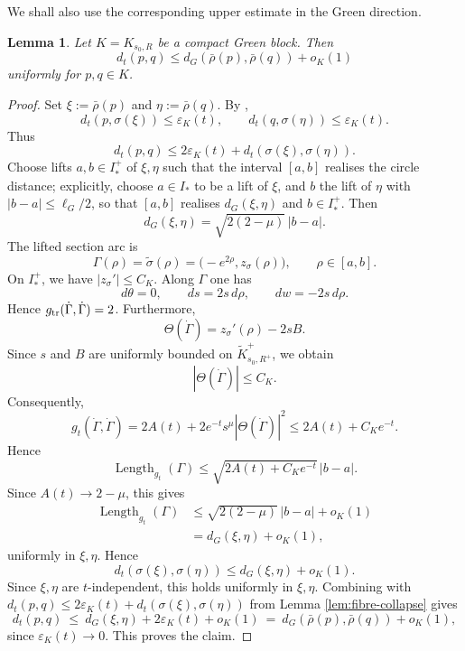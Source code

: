 \documentclass[12pt]{amsart}
\numberwithin{equation}{section}
\newtheorem{lema}{Lemma}
\theoremstyle{remark}
\theoremstyle{definition}
\begin{document}
We shall also use the corresponding upper estimate in the Green direction.

\begin{lema}
\label{lem:green-upper-estimate}
Let $K=K_{s_0,R}$ be a compact Green block. Then
\begin{equation*}
d_t(p,q)
\leq
d_G(\bar\rho(p),\bar\rho(q))+o_K(1)
\end{equation*}
uniformly for $p,q\in K$.
\end{lema}

\begin{proof}
Set $\xi:=\bar\rho(p)$ and $\eta:=\bar\rho(q)$.
By ,
$$
d_t(p,\sigma(\xi))\leq \varepsilon_K(t),
\qquad
d_t(q,\sigma(\eta))\leq \varepsilon_K(t).
$$
Thus
$$
d_t(p,q)
\leq
2\varepsilon_K(t)+d_t(\sigma(\xi),\sigma(\eta)).
$$
Choose lifts $a,b\in I_*^+$ of $\xi,\eta$ such that the interval
$[a,b]$ realises the circle distance; explicitly, choose $a\in I_*$ to be a lift of $\xi$, and
$b$ the lift of $\eta$ with $|b-a|\le\ell_G/2$, so that $[a,b]$ realises
$d_G(\xi,\eta)$ and $b\in I^+_*$.
Then
$$
d_G(\xi,\eta)
=
\sqrt{2(2-\mu)}\,|b-a|.
$$
The lifted section arc is
$$
\Gamma(\rho)=\widetilde\sigma(\rho)
=
\bigl(-e^{2\rho},z_\sigma(\rho)\bigr),
\qquad
\rho\in[a,b].
$$
On $I_*^+$, we have $|z_\sigma'|\leq C_K$. Along $\Gamma$ one has
$$
d\theta=0,
\qquad
ds=2s\,d\rho,
\qquad
dw=-2s\,d\rho.
$$
Hence $g_{\rm tr}(\dot\Gamma,\dot\Gamma)=2$. Furthermore,
$$
\Theta(\dot\Gamma)
=
z_\sigma'(\rho)-2sB.
$$
Since $s$ and $B$ are uniformly bounded on $\widetilde K^+_{s_0,R^+}$, we obtain
$$
|\Theta(\dot\Gamma)|\leq C_K.
$$
Consequently,
$$
g_t(\dot\Gamma,\dot\Gamma)=2A(t)+2e^{-t}s^\mu|\Theta(\dot\Gamma)|^2\leq 2A(t)+C_K e^{-t}.
$$
Hence
$$
\operatorname{Length}_{g_t}(\Gamma)
\leq
\sqrt{2A(t)+C_Ke^{-t}}\,|b-a|.
$$
Since $A(t)\to2-\mu$, this gives
\begin{align*}
\operatorname{Length}_{g_t}(\Gamma)
&\leq
\sqrt{2(2-\mu)}\,|b-a|+o_K(1)\\
&=
d_G(\xi,\eta)+o_K(1),
\end{align*}
uniformly in $\xi,\eta$. Hence
$$
d_t(\sigma(\xi),\sigma(\eta))
\leq
d_G(\xi,\eta)+o_K(1).
$$
Since $\xi,\eta$ are $t$-independent, this holds uniformly in $\xi,\eta$.
Combining with $d_t(p,q)\le2\varepsilon_K(t)+d_t(\sigma(\xi),\sigma(\eta))$
from Lemma \ref{lem:fibre-collapse} gives
\[
d_t(p,q)\ \le\ d_G(\xi,\eta)+2\varepsilon_K(t)+o_K(1)\ =\ d_G(\bar\rho(p),\bar\rho(q))+o_K(1),
\]
since $\varepsilon_K(t)\to0$. This proves the claim. 
\end{proof}
\end{document}
